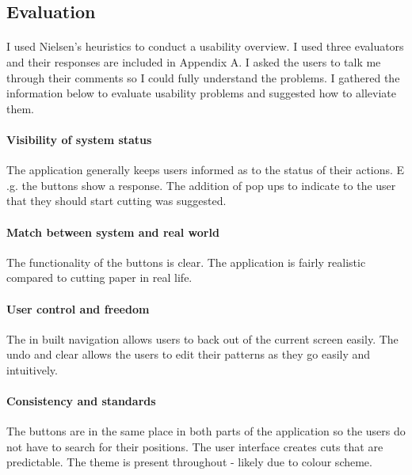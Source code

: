 \documentclass[11pt]{article}
\begin{document}
            \subsection{Evaluation}
            
                \paragraph{}
                I used Nielsen's heuristics to conduct a usability overview. I used three evaluators and their responses are included in Appendix A. I asked the users to talk me through their comments so I could fully understand the problems. I gathered the information below to evaluate usability problems and suggested how to alleviate them. 

                
                \paragraph{Visibility of system status}
                The application generally keeps users informed as to the status of their actions. E .g. the buttons show a response. The addition of pop ups to indicate to the user that they should start cutting was suggested. 
                
                \paragraph{Match between system and real world}
                The functionality of the buttons is clear. The application is fairly realistic compared to cutting paper in real life. 
                
                \paragraph{User control and freedom}
                The in built navigation allows users to back out of the current screen easily. The undo and clear allows the users to edit their patterns as they go easily and intuitively. 

                \paragraph{Consistency and standards}
                The buttons are in the same place in both parts of the application so the users do not have to search for their positions. The user interface creates cuts that are predictable. The theme is present throughout - likely due to colour scheme.
\end{document}
